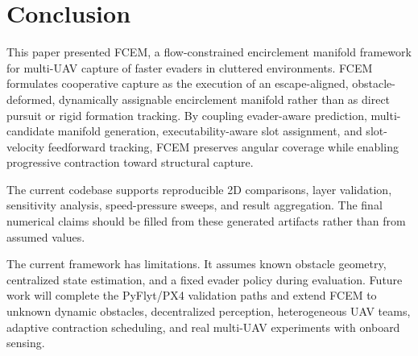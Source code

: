 \documentclass[journal]{IEEEtran}
\begin{document}
\section{Conclusion}
\label{sec:conclusion}

This paper presented FCEM, a flow-constrained encirclement manifold framework for multi-UAV capture of faster evaders in cluttered environments.
FCEM formulates cooperative capture as the execution of an escape-aligned, obstacle-deformed, dynamically assignable encirclement manifold rather than as direct pursuit or rigid formation tracking.
By coupling evader-aware prediction, multi-candidate manifold generation, executability-aware slot assignment, and slot-velocity feedforward tracking, FCEM preserves angular coverage while enabling progressive contraction toward structural capture.

The current codebase supports reproducible 2D comparisons, layer validation, sensitivity analysis, speed-pressure sweeps, and result aggregation.
The final numerical claims should be filled from these generated artifacts rather than from assumed values.

The current framework has limitations.
It assumes known obstacle geometry, centralized state estimation, and a fixed evader policy during evaluation.
Future work will complete the PyFlyt/PX4 validation paths and extend FCEM to unknown dynamic obstacles, decentralized perception, heterogeneous UAV teams, adaptive contraction scheduling, and real multi-UAV experiments with onboard sensing.


\balance


\end{document}
